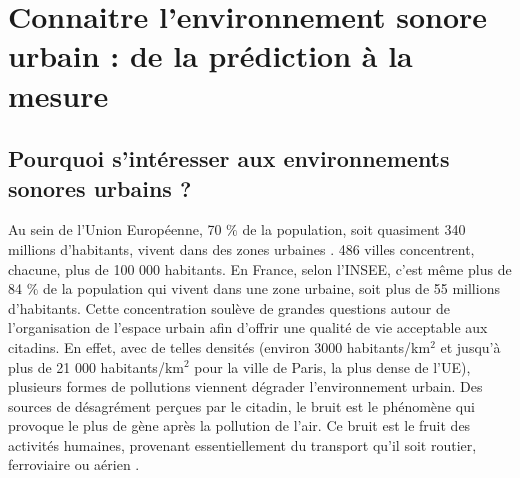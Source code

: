 %
%
%
%
%

\chapter{Connaitre l'environnement sonore urbain : de la prédiction à la mesure}
\thispagestyle{empty}

\section{Pourquoi s'intéresser aux environnements sonores urbains ?}

Au sein de l'Union Européenne, 70 $\%$ de la population, soit quasiment 340 millions d'habitants, vivent dans des zones urbaines \cite{europ-commission_data_2017}. 486 villes concentrent, chacune, plus de 100 000 habitants. En France, selon l'INSEE, c'est même plus de 84 $\%$ de la population qui vivent dans une zone urbaine, soit plus de 55 millions d'habitants. Cette concentration soulève de grandes questions autour de l'organisation de l'espace urbain afin d'offrir une qualité de vie acceptable aux citadins. En effet, avec de telles densités (environ 3000 habitants/km$^2$ et jusqu'à plus de 21 000  habitants/km$^2$ pour la ville de Paris, la plus dense de l'UE), plusieurs formes de pollutions viennent dégrader l'environnement urbain. Des sources de désagrément perçues par le citadin, le bruit est le phénomène qui provoque le plus de gène après la pollution de l'air. Ce bruit est le fruit des activités humaines, provenant essentiellement du transport qu'il soit routier, ferroviaire ou aérien \cite{zannin_characterization_2013}.\\

